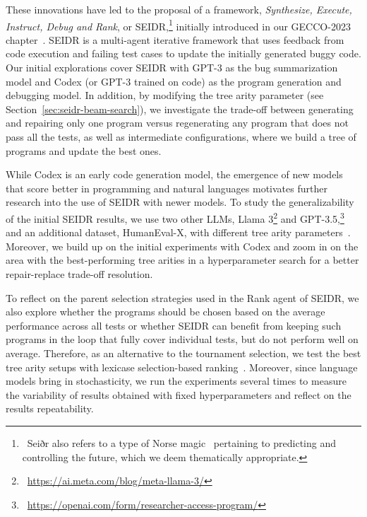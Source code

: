 These innovations have led to the proposal of a framework, \emph{Synthesize, Execute, Instruct, Debug and Rank}, or SEIDR,\footnote{~Seiðr also refers to a type of Norse magic~\cite{blain2002:nine} pertaining to predicting and controlling the future, which we deem thematically appropriate.} initially introduced in our GECCO-2023  chapter~\cite{liventsevFullyAutonomousProgramming2023}. 
SEIDR is a multi-agent iterative framework that uses feedback from code execution and failing test cases to update the initially generated buggy code. 
Our initial explorations cover SEIDR with GPT-3 as the bug summarization model and Codex (or GPT-3 trained on code) as the program generation and debugging model.  
In addition, by modifying the tree arity parameter (see Section~\ref{sec:seidr-beam-search}), we investigate the trade-off between generating and repairing only one program versus regenerating any program that does not pass all the tests, as well as intermediate configurations, where we build a tree of programs and update the best ones.

While Codex is an early code generation model, the emergence of new models that score better in programming and natural languages motivates further research into the use of SEIDR with newer models. 
To study the generalizability of the initial SEIDR results, we use two other LLMs, Llama 3\footnote{~\url{https://ai.meta.com/blog/meta-llama-3/}} and GPT-3.5,\footnote{~\url{https://openai.com/form/researcher-access-program/}} and an additional dataset, HumanEval-X, with different tree arity parameters~\cite{brown2020:language,chenEvaluatingLargeLanguage2021,zheng2023:codegeex}. 
Moreover, we build up on the initial experiments with Codex and zoom in on the area with the best-performing tree arities in a hyperparameter search for a better repair-replace trade-off resolution. 

To reflect on the parent selection strategies used in the Rank agent of SEIDR, we also explore whether the programs should be chosen based on the average performance across all tests or whether SEIDR can benefit from keeping such programs in the loop that fully cover individual tests, but do not perform well on average.
Therefore, as an alternative to the tournament selection, we test the best tree arity setups with lexicase selection-based ranking~\cite{helmuth2015:solving}.
Moreover, since language models bring in stochasticity, we run the experiments several times to measure the variability of results obtained with fixed hyperparameters and reflect on the results repeatability.

